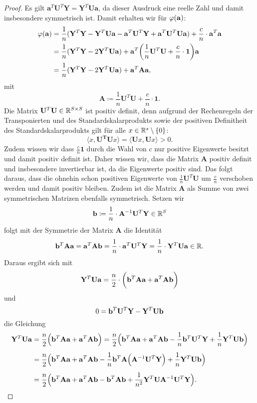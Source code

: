\begin{proof}
Es gilt $\mathbf{a}^T\mathbf{U}^T\mathbf{Y} = \mathbf{Y}^T\mathbf{U}\mathbf{a}$, da dieser Ausdruck eine reelle Zahl und damit insbesondere symmetrisch ist. Damit erhalten wir für $\varphi(\mathbf{a})$:
\begin{equation}
\label{eq:matrix}
\begin{split}
\varphi(\mathbf{a}) & =   \frac{1}{n}(\mathbf{Y}^T\mathbf{Y} - \mathbf{Y}^T\mathbf{U}\mathbf{a} - \mathbf{a}^T\mathbf{U}^T\mathbf{Y} + \mathbf{a}^T\mathbf{U}^T\mathbf{U}\mathbf{a}) + \frac{c}{n} \cdot \mathbf{a}^T\mathbf{a} \\
& = \frac{1}{n}(\mathbf{Y}^T\mathbf{Y} - 2\mathbf{Y}^T\mathbf{U}\mathbf{a}) + \mathbf{a}^T\bigg(\frac{1}{n} \mathbf{U}^T\mathbf{U} + \frac{c}{n} \cdot \mathbf{1}\bigg) \mathbf{a} \\
& = \frac{1}{n}(\mathbf{Y}^T\mathbf{Y} - 2\mathbf{Y}^T\mathbf{U}\mathbf{a}) + \mathbf{a}^T \mathbf{A} \mathbf{a},
\end{split}
\end{equation} 
mit $$\mathbf{A} \coloneqq \frac{1}{n}\mathbf{U}^T\mathbf{U} + \frac{c}{n} \cdot \mathbf{1}.$$
Die Matrix $\mathbf{U}^T\mathbf{U} \in \mathbb{R}^{S \times S}$ ist positiv definit, denn aufgrund der Rechenregeln der Transponierten und des Standardskalarprodukts sowie der positiven Definitheit des Standardskalarprodukts gilt für alle $x \in \mathbb{R}^s\setminus\{0\}$:
$$\langle x, \mathbf{U^T}\mathbf{U} x\rangle = \langle \mathbf{U} x, \mathbf{U} x\rangle > 0.$$
Zudem wissen wir dass $\frac{c}{n}\mathbf{1}$ durch die Wahl von $c$ nur positive Eigenwerte besitzt und damit positiv definit ist.  
Daher wissen wir, dass die Matrix
$\mathbf{A}$ positiv definit und insbesondere invertierbar ist, da die Eigenwerte positiv sind. Das folgt daraus, dass die ohnehin schon positiven Eigenwerte von $\frac{1}{n}\mathbf{U}^T\mathbf{U}$ um $\frac{c}{n}$ verschoben werden und damit positiv bleiben. Zudem ist die Matrix $\mathbf{A}$ als Summe von zwei symmetrischen Matrizen ebenfalls symmetrisch. 
Setzen wir $$\mathbf{b} \coloneqq \frac{1}{n} \cdot \mathbf{A}^{-1}\mathbf{U}^T\mathbf{Y} \in \mathbb{R}^S$$ folgt mit der Symmetrie der Matrix $\mathbf{A}$ die Identität $$\mathbf{b}^T\mathbf{A}\mathbf{a} = \mathbf{a}^T\mathbf{A}\mathbf{b} = \frac{1}{n} \cdot \mathbf{a}^T\mathbf{U}^T\mathbf{Y} = \frac{1}{n} \cdot \mathbf{Y}^T\mathbf{U}\mathbf{a} \in \mathbb{R}.$$ Daraus ergibt sich mit
$$ \mathbf{Y}^T\mathbf{U}\mathbf{a} = \frac{n}{2} \cdot \bigg( \mathbf{b}^T\mathbf{A}\mathbf{a} + \mathbf{a}^T\mathbf{A}\mathbf{b} \bigg) $$
und $$0 = \mathbf{b}^T\mathbf{U}^T\mathbf{Y} - \mathbf{Y}^T\mathbf{U}\mathbf{b}$$
die Gleichung 
\begin{equation}
\begin{split}
 \mathbf{Y}^T\mathbf{U}\mathbf{a} & = \frac{n}{2} \Big(\mathbf{b}^T\mathbf{A}\mathbf{a} + \mathbf{a}^T\mathbf{A}\mathbf{b}\Big) = \frac{n}{2}\Big( \mathbf{b}^T\mathbf{A}\mathbf{a} + \mathbf{a}^T\mathbf{A}\mathbf{b} - \frac{1}{n}\mathbf{b}^T\mathbf{U}^T\mathbf{Y} + \frac{1}{n}\mathbf{Y}^T\mathbf{U}\mathbf{b} \Big)\\[0.5em]
 & = \frac{n}{2} \Big( \mathbf{b}^T\mathbf{A}\mathbf{a} + \mathbf{a}^T\mathbf{A}\mathbf{b} - \frac{1}{n}\mathbf{b}^T\mathbf{A}\Big(\mathbf{A}^{-1}\mathbf{U}^T\mathbf{Y}\Big) + \frac{1}{n}\mathbf{Y}^T\mathbf{U}\mathbf{b} \Big)\\[0.5em]
& = \frac{n}{2} \Big(\mathbf{b}^T\mathbf{A}\mathbf{a} + \mathbf{a}^T\mathbf{A}\mathbf{b} - \mathbf{b}^T\mathbf{A}\mathbf{b} + \frac{1}{n^2}\mathbf{Y}^T\mathbf{U}\mathbf{A}^{-1}\mathbf{U}^T\mathbf{Y} \Big).
\end{split}
\end{equation}


\end{proof}
